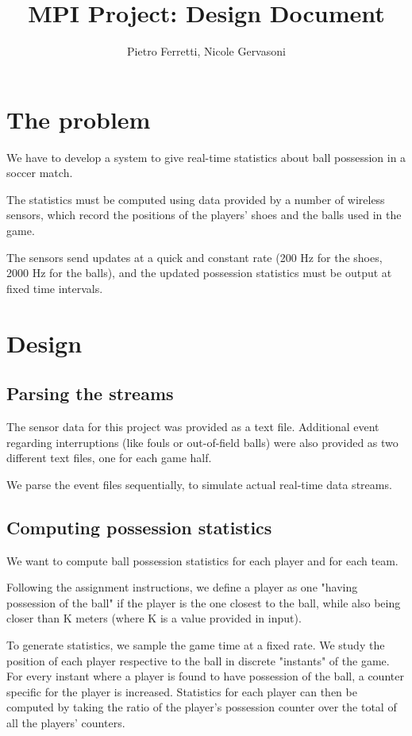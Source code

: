 \documentclass[a4paper]{article}
\begin{document}
\title{MPI Project: Design Document}	
\author{Pietro Ferretti, Nicole Gervasoni}
\date{}
\maketitle

\section{The problem}
We have to develop a system to give real-time statistics about ball possession in a soccer match.

The statistics must be computed using data provided by a number of wireless sensors, which record the positions of the players' shoes and the balls used in the game.

The sensors send updates at a quick and constant rate (200 Hz for the shoes, 2000 Hz for the balls), and the updated possession statistics must be output at fixed time intervals.


\section{Design}
\subsection{Parsing the streams}
The sensor data for this project was provided as a text file.
Additional event regarding interruptions (like fouls or out-of-field balls) were also provided as two different text files, one for each game half.

We parse the event files sequentially, to simulate actual real-time data streams.

\subsection{Computing possession statistics}
We want to compute ball possession statistics for each player and for each team.

Following the assignment instructions, we define a player as one "having possession of the ball" if the player is the one closest to the ball, while also being closer than K meters (where K is a value provided in input).

To generate statistics, we sample the game time at a fixed rate. We study the position of each player respective to the ball in discrete "instants" of the game. For every instant where a player is found to have possession of the ball, a counter specific for the player is increased. Statistics for each player can then be computed by taking the ratio of the player's possession counter over the total of all the players' counters.
\end{document}

